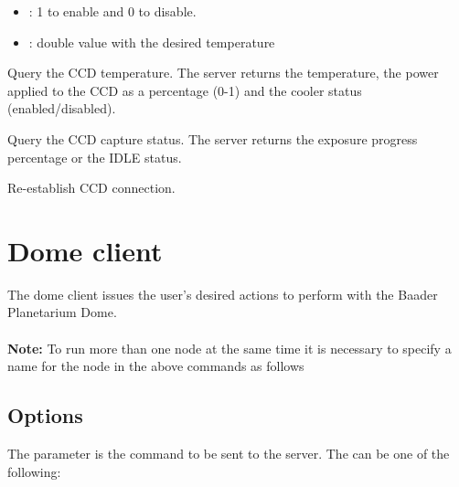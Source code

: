 \documentclass[a4paper,english]{article}
\begin{document}
\begin{Description}
	      
	
	\begin{itemize}
		\item {}: 1 to enable and 0 to disable.
		\item {}: double value with the desired temperature
	\end{itemize}
	
\item[\Arg{gettemp}] Query the CCD temperature. The server returns the temperature, the power applied to the CCD as a percentage (0-1) and the cooler status (enabled/disabled).

	   
	
\item[\Arg{getcapstatus}] Query the CCD capture status. The server returns the exposure progress percentage or the IDLE status.

	   
	
\item[\Arg{reconnect}] Re-establish CCD connection.

	   
	
\end{Description}


\section{Dome client}

The dome client issues the user's desired actions to perform with the Baader Planetarium Dome. \\

   \\

\textbf{Note:} To run more than one  node at the same time it is necessary to specify a name for the node in the above commands as follows 


\subsection{Options}

The  parameter is the command to be sent to the server. The  can be one of the following:
\end{document}
